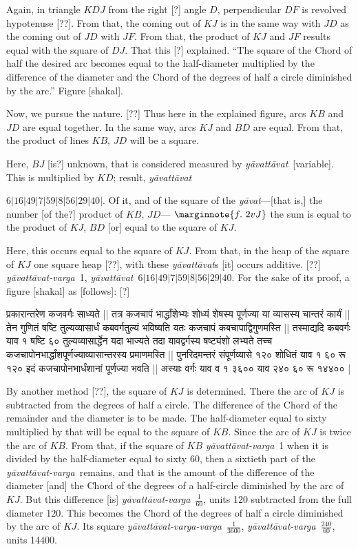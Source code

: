 \documentclass[12pt]{book}
\def\ya{\textit{y\=avat\-t\=avat}}
\def\yava{\textit{y\=avat\-t\=avat-varga}}
\def\yavava{\textit{y\=avat\-t\=avat-varga-varga}}
\begin{document}
\newpage

Again, in triangle $KDJ$ from the right [?] angle $D$, perpendicular $DF$ 
is revolved hypotenuse [??].  From that, the coming out of $KJ$ is in the same
way with $JD$ as the coming out of $JD$ with $JF$. 
From that, the product of $KJ$ and $JF$ results equal with the square of 
$DJ$. That this [?] explained. ``The square of the Chord of half the desired arc
becomes equal to the half-diameter multiplied by the difference of the 
diameter and the Chord of the degrees of half a circle diminished by the arc.''
Figure [shakal]. 

Now, we pursue the nature.  [??] Thus here in the explained figure, arcs
$KB$ and $JD$ are equal together. In the same way, arcs $KJ$ and  $BD$ 
are equal.  From that, the product of lines $KB$, $JD$ will be a square.

Here, $BJ$ [is?] unknown, that is considered measured by \ya\ [variable]. 
This is multiplied by $KD$; result, \ya\ 

$6|16|49|7|59|8|56|29|40|$. 
Of it, and of the square of the \textit{y\=avat}---[that is,] 
the number [of the?] product of $KB$, $JD$---
$\marginnote{f.~2v J}$ 
the sum is equal to the product of $KJ$, $BD$ [or] equal to the square of $KJ$.

Here, this occurs equal to the square of $KJ$. From that, in the heap of the
square of $KJ$ one square heap [??], with these \ya s [it] occurs additive. [??]
\yava\ 1, \ya\ $6|16|49|7|59|8|56|29|40$. For the sake of its proof, a figure
[shakal] as [follows]: [?] 

\newpage

{\s प्रकारान्तरेण कजवर्गः साध्यते || तत्र कजचापं
भार्द्धांशेभ्यः शोध्यं शेषस्य पूर्णज्या या व्यासस्य चान्तरं कार्यं ||
तेन
गुणितं षष्टि तुल्यव्यासार्धं कबवर्गतुल्यं भविष्यति
यतः कजचापं
कबचापाद्विगुणमस्ति ||
तस्माद्यदि कबवर्गः याव १ षष्टि ६० तुल्यव्यासार्द्धेन यदा
भाज्यते तदा यावद्वर्गस्य षष्ट्यंशो लभ्यते तच्च
कजचापोनभार्द्धांशपूर्णज्याव्यासान्तरस्य प्रमाणमस्ति || पुनरिदमन्तरं
संपूर्णव्यासे १२० शोधितं याव १ ६० रू १२० इदं
कजचापोनभार्धंशानां पूर्णज्या भवति ||
अस्याः वर्गः याव व १ ३६०० याव
२४० ६० रू १४४०० |}

\newpage

By another method [??], the square of $KJ$ is determined.  There the arc of $KJ$ 
is subtracted from the degrees of half a circle. The difference of the Chord of the
remainder and the diameter is to be made. The half-diameter equal to sixty 
multiplied by that will be equal to the square of $KB$. Since the arc of $KJ$
is twice the arc of $KB$.  From that, if the square of $KB$ \yava\ 1 when it is
divided by the half-diameter equal to sixty 60, then a sixtieth part of the 
\yava\ remains, and that is the amount of the difference
of the diameter [and] the Chord of the degrees of a half-circle
diminished by the arc of $KJ$.  But this difference [is] \yava\ $\frac{1}{60}$, units 120
subtracted from the 
full diameter 120. This becomes the 
Chord of the degrees of half a circle diminished by the arc of $KJ$. 
Its square \yavava\ $\frac{1}{3600}$, \yava\ $\frac{240}{60}$, units 14400. 
\end{document}
